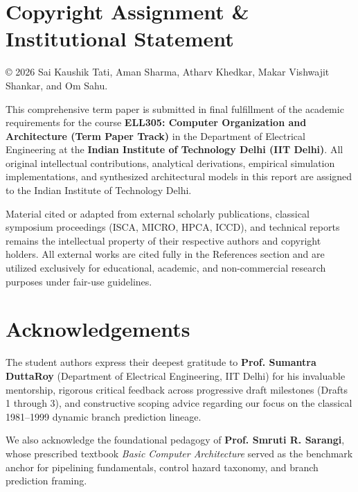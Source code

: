\documentclass[11pt,a4paper]{article}
\begin{document}
\section*{Copyright Assignment \& Institutional Statement}

\noindent\copyright{} 2026 Sai Kaushik Tati, Aman Sharma, Atharv Khedkar, Makar Vishwajit Shankar, and Om Sahu.

\vspace{0.8em}
\noindent
This comprehensive term paper is submitted in final fulfillment of the academic requirements for the course \textbf{ELL305: Computer Organization and Architecture (Term Paper Track)} in the Department of Electrical Engineering at the \textbf{Indian Institute of Technology Delhi (IIT Delhi)}. All original intellectual contributions, analytical derivations, empirical simulation implementations, and synthesized architectural models in this report are assigned to the Indian Institute of Technology Delhi. 

\vspace{0.8em}
\noindent
Material cited or adapted from external scholarly publications, classical symposium proceedings (ISCA, MICRO, HPCA, ICCD), and technical reports remains the intellectual property of their respective authors and copyright holders. All external works are cited fully in the References section and are utilized exclusively for educational, academic, and non-commercial research purposes under fair-use guidelines.

\vspace{2.5em}
\section*{Acknowledgements}

\noindent
The student authors express their deepest gratitude to \textbf{Prof. Sumantra DuttaRoy} (Department of Electrical Engineering, IIT Delhi) for his invaluable mentorship, rigorous critical feedback across progressive draft milestones (Drafts 1 through 3), and constructive scoping advice regarding our focus on the classical 1981--1999 dynamic branch prediction lineage.

\vspace{0.8em}
\noindent
We also acknowledge the foundational pedagogy of \textbf{Prof. Smruti R. Sarangi}, whose prescribed textbook \textit{Basic Computer Architecture} served as the benchmark anchor for pipelining fundamentals, control hazard taxonomy, and branch prediction framing. 
\end{document}
